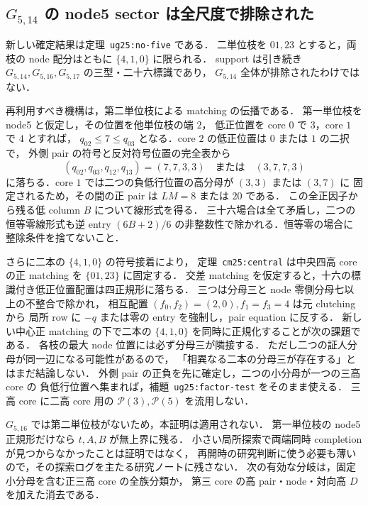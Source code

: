 \subsection{\texorpdfstring{$G_{5,14}$}{G5,14} の node5 sector は全尺度で排除された}
\label{ug25:notes}

新しい確定結果は定理~\texttt{ug25:no-five} である．
二単位枝を $01,23$ とすると，両枝の node 配分はともに $\{4,1,0\}$ に限られる．
support は引き続き $G_{5,14},G_{5,16},G_{5,17}$ の三型・二十六標識であり，
$G_{5,14}$ 全体が排除されたわけではない．

再利用すべき機構は，第二単位枝による matching の伝播である．
第一単位枝を node5 と仮定し，その位置を他単位枝の端 $2$，
低正位置を core $0$ で $3$，core $1$ で $4$ とすれば，
$q_{02}\le7\le q_{03}$ となる．core $2$ の低正位置は $0$ または $1$ の二択で，
外側 pair の符号と反対符号位置の完全表から
\[
 (q_{02},q_{03},q_{12},q_{13})
 =(7,7,3,3)\quad\text{または}\quad(3,7,7,3)
\]
に落ちる．core $1$ では二つの負低行位置の高分母が $(3,3)$ または $(3,7)$ に
固定されるため，その間の正 pair は $LM=8$ または $20$ である．
この全正因子から残る低 column $B$ について線形式を得る．
三十六場合は全て矛盾し，二つの恒等零線形式も逆 entry
$(6B+2)/6$ の非整数性で除かれる．恒等零の場合に整除条件を捨てないこと．

さらに二本の $\{4,1,0\}$ の符号接着により，
定理~\texttt{cm25:central} は中央四高 core の正 matching を $\{01,23\}$ に固定する．
交差 matching を仮定すると，十六の標識付き低正位置配置は四正規形に落ちる．
三つは分母三と node 零側分母七以上の不整合で除かれ，
相互配置 $(f_0,f_2)=(2,0),f_1=f_3=4$ は元 clutching から
局所 row に $-q$ または零の entry を強制し，pair equation に反する．
新しい中心正 matching の下で二本の $\{4,1,0\}$ を同時に正規化することが次の課題である．
各枝の最大 node 位置には必ず分母三が隣接する．
ただし二つの証人分母が同一辺になる可能性があるので，
「相異なる二本の分母三が存在する」とはまだ結論しない．
外側 pair の正負を先に確定し，二つの小分母が一つの三高 core の
負低行位置へ集まれば，補題~\texttt{ug25:factor-test} をそのまま使える．
三高 core に二高 core 用の $\mathcal P(3),\mathcal P(5)$ を流用しない．

$G_{5,16}$ では第二単位枝がないため，本証明は適用されない．
第一単位枝の node5 正規形だけなら $t,A,B$ が無上界に残る．
小さい局所探索で両端同時 completion が見つからなかったことは証明ではなく，
再開時の研究判断に使う必要も薄いので，その探索ログを主たる研究ノートに残さない．
次の有効な分岐は，固定小分母を含む正三高 core の全族分類か，
第三 core の高 pair・node・対向高 $D$ を加えた消去である．
